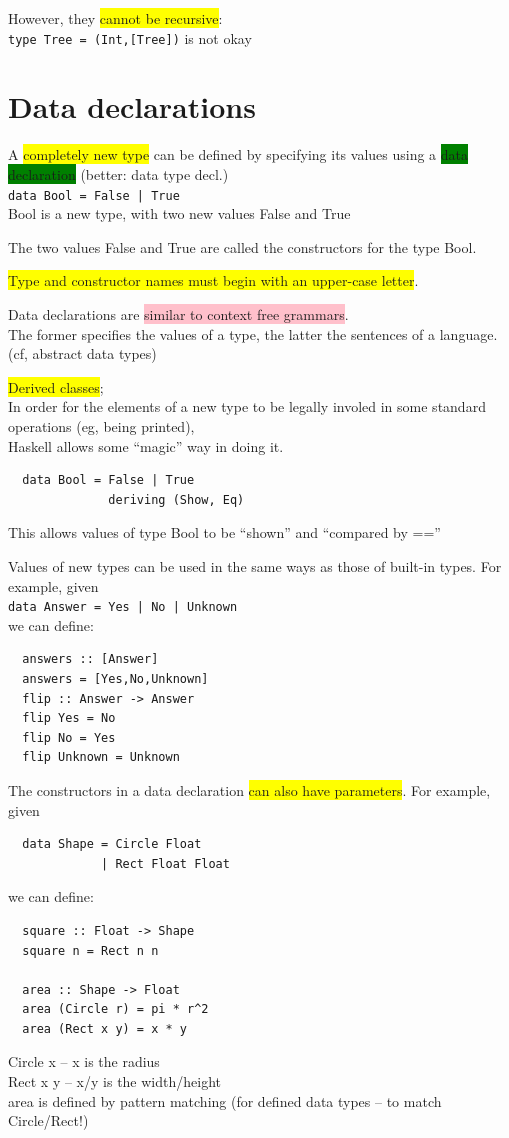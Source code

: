\documentclass[tikz,border=10pt]{project_plan}
\begin{document}
However, they \colorbox{yellow}{cannot be recursive}:\\
\lstinline?type Tree = (Int,[Tree])? is not okay

\section{Data declarations}

A \colorbox{yellow}{completely new type} can be defined by specifying its
values using a \colorbox{green}{data declaration} (better: data type decl.)\\
\lstinline?data Bool = False | True?\\
Bool is a new type, with two new values False and True

The two values False and True are called the constructors for the type Bool.

\colorbox{yellow}{Type and constructor names must begin with an upper-case letter}.

Data declarations are \colorbox{pink}{similar to context free grammars}.\\
The former specifies the values of a type, the latter the
sentences of a language. (cf, abstract data types)

\colorbox{yellow}{Derived classes};\\
In order for the elements of a new type to be legally
involed in some standard operations (eg, being printed),\\
Haskell allows some “magic” way in doing it.
\begin{lstlisting}
  data Bool = False | True
              deriving (Show, Eq)
\end{lstlisting}
This allows values of type Bool to be “shown” and “compared by ==”

Values of new types can be used in the same ways as
those of built-in types. For example, given\\
\lstinline?data Answer = Yes | No | Unknown?\\
we can define:
\begin{lstlisting}
  answers :: [Answer]
  answers = [Yes,No,Unknown]
  flip :: Answer -> Answer
  flip Yes = No
  flip No = Yes
  flip Unknown = Unknown
\end{lstlisting}

The constructors in a data declaration \colorbox{yellow}{can also have
  parameters}. For example, given
\begin{lstlisting}
  data Shape = Circle Float
             | Rect Float Float
\end{lstlisting}
we can define:
\begin{lstlisting}
  square :: Float -> Shape
  square n = Rect n n

  area :: Shape -> Float
  area (Circle r) = pi * r^2
  area (Rect x y) = x * y
\end{lstlisting}
Circle x – x is the radius\\
Rect x y – x/y is the width/height\\
area is defined by pattern matching (for defined data types – to match Circle/Rect!)
\end{document}
